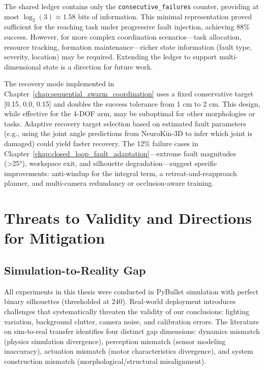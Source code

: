 \documentclass[12pt,a4paper,oneside]{report}
\begin{document}
The shared ledger contains only the \texttt{consecutive\_failures} counter, providing at most $\log_2(3) \approx 1.58$ bits of information. This minimal representation proved sufficient for the reaching task under progressive fault injection, achieving 88\% success. However, for more complex coordination scenarios—task allocation, resource tracking, formation maintenance—richer state information (fault type, severity, location) may be required. Extending the ledger to support multi-dimensional state is a direction for future work.

The recovery mode implemented in Chapter~\ref{chap:sequential_swarm_coordination} uses a fixed conservative target [0.15, 0.0, 0.15] and doubles the success tolerance from 1 cm to 2 cm. This design, while effective for the 4-DOF arm, may be suboptimal for other morphologies or tasks. Adaptive recovery target selection based on estimated fault parameters (e.g., using the joint angle predictions from NeuroKin-3D to infer which joint is damaged) could yield faster recovery. The 12\% failure cases in Chapter~\ref{chap:closed_loop_fault_adaptation}—extreme fault magnitudes (>25°), workspace exit, and silhouette degradation—suggest specific improvements: anti-windup for the integral term, a retreat-and-reapproach planner, and multi-camera redundancy or occlusion-aware training.

\section{Threats to Validity and Directions for Mitigation}

\subsection{Simulation-to-Reality Gap}
\label{subsec:simulation_to_reality_gap}

All experiments in this thesis were conducted in PyBullet simulation with perfect binary silhouettes (thresholded at 240). Real-world deployment introduces challenges that systematically threaten the validity of our conclusions: lighting variation, background clutter, camera noise, and calibration errors. The literature on sim-to-real transfer \cite{tan2018simtoreal, aljalbout2026realitygap} identifies four distinct gap dimensions: dynamics mismatch (physics simulation divergence), perception mismatch (sensor modeling inaccuracy), actuation mismatch (motor characteristics divergence), and system construction mismatch (morphological/structural misalignment).
\end{document}
